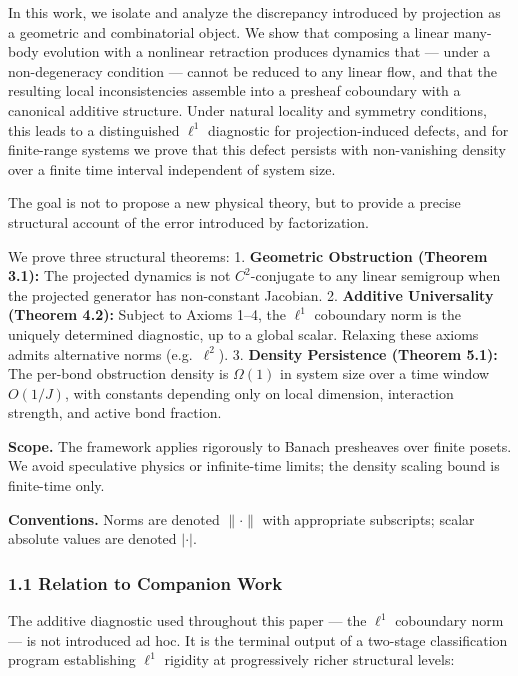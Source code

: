 \documentclass[
]{article}
\begin{document}
In this work, we isolate and analyze the discrepancy introduced by
projection as a geometric and combinatorial object. We show that
composing a linear many-body evolution with a nonlinear retraction
produces dynamics that --- under a non-degeneracy condition --- cannot
be reduced to any linear flow, and that the resulting local
inconsistencies assemble into a presheaf coboundary with a canonical
additive structure. Under natural locality and symmetry conditions, this
leads to a distinguished \(\ell^1\) diagnostic for projection-induced
defects, and for finite-range systems we prove that this defect persists
with non-vanishing density over a finite time interval independent of
system size.

The goal is not to propose a new physical theory, but to provide a
precise structural account of the error introduced by factorization.

We prove three structural theorems: 1. \textbf{Geometric Obstruction
(Theorem 3.1):} The projected dynamics is not \(C^2\)-conjugate to any
linear semigroup when the projected generator has non-constant Jacobian.
2. \textbf{Additive Universality (Theorem 4.2):} Subject to Axioms 1--4,
the \(\ell^1\) coboundary norm is the uniquely determined diagnostic, up
to a global scalar. Relaxing these axioms admits alternative norms
(e.g.~\(\ell^2\)). 3. \textbf{Density Persistence (Theorem 5.1):} The
per-bond obstruction density is \(\Omega(1)\) in system size over a time
window \(O(1/J)\), with constants depending only on local dimension,
interaction strength, and active bond fraction.

\textbf{Scope.} The framework applies rigorously to Banach presheaves
over finite posets. We avoid speculative physics or infinite-time
limits; the density scaling bound is finite-time only.

\textbf{Conventions.} Norms are denoted \(\lVert \cdot \rVert\) with
appropriate subscripts; scalar absolute values are denoted \(|\cdot|\).

\subsubsection{1.1 Relation to Companion
Work}\label{relation-to-companion-work}

The additive diagnostic used throughout this paper --- the \(\ell^1\)
coboundary norm --- is not introduced ad hoc. It is the terminal output
of a two-stage classification program establishing \(\ell^1\) rigidity
at progressively richer structural levels:
\end{document}
